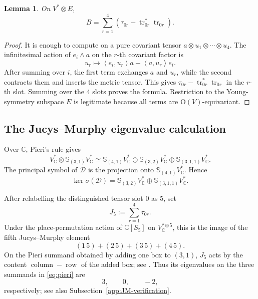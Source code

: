 \documentclass[reqno,11pt]{amsart}
\newtheorem{lemma}[theorem]{Lemma}
\theoremstyle{definition}
\newcommand{\bbC}{\mathbb C}
\newcommand{\cD}{\mathcal D}
\newcommand{\Hook}{\mathbb S_{(3,1)}}
\newcommand{\inner}[2]{\left\langle #1,#2\right\rangle}
\begin{document}
\begin{lemma}\label{lem:Bformula}
On $V^*\otimes E$,
\begin{equation}\label{eq:Bformula}
  B=\sum_{r=1}^4
  \left(
    \tau_{0r}-\operatorname{tr}_{0r}^*\operatorname{tr}_{0r}
  \right).
\end{equation}
\end{lemma}

\begin{proof}
It is enough to compute on a pure covariant tensor
$a\otimes u_1\otimes\cdots\otimes u_4$. The infinitesimal action of
$e_i\wedge a$ on the $r$-th covariant factor is
$$
  u_r\longmapsto
  \inner{e_i}{u_r}a-\inner{a}{u_r}e_i.
$$
After summing over $i$, the first term exchanges $a$ and $u_r$, while the
second contracts them and inserts the metric tensor. This gives
$\tau_{0r}-\operatorname{tr}_{0r}^*\operatorname{tr}_{0r}$ in the $r$-th
slot. Summing over the $4$ slots proves the formula. Restriction to the
Young-symmetry subspace $E$ is legitimate because all terms are
$\mathrm O(V)$-equivariant.
\end{proof}

\subsection{The Jucys--Murphy eigenvalue calculation}

Over $\bbC$, Pieri's rule gives
\begin{equation}\label{eq:pieri}
  V_\bbC^*\otimes\Hook V_\bbC^*
  \simeq
  \mathbb S_{(4,1)}V_\bbC^*
  \oplus
  \mathbb S_{(3,2)}V_\bbC^*
  \oplus
  \mathbb S_{(3,1,1)}V_\bbC^*.
\end{equation}
The principal symbol of $\cD$ is the projection onto
$\mathbb S_{(4,1)}V_\bbC^*$. Hence
\begin{equation}\label{eq:kernel-symbol}
  \ker\sigma(\cD)
  =
  \mathbb S_{(3,2)}V_\bbC^*
  \oplus
  \mathbb S_{(3,1,1)}V_\bbC^*.
\end{equation}

After relabelling the distinguished tensor slot $0$ as $5$, set
$$
  J_5:=\sum_{r=1}^4\tau_{0r}.
$$
Under the place-permutation action of $\bbC[S_5]$ on
$V_\bbC^{*\otimes5}$, this is the image of the fifth Jucys--Murphy element
$$
  (1\,5)+(2\,5)+(3\,5)+(4\,5).
$$
On the Pieri summand obtained by adding one box to $(3,1)$,
$J_5$ acts by the content
$\operatorname{column}-\operatorname{row}$ of the added box;
see \cite[\S\S3.2--3.3]{CeccheriniScarabottiTolli10}.
Thus its eigenvalues on the three summands in \eqref{eq:pieri} are
\begin{equation}\label{eq:contents}
  3,\qquad 0,\qquad -2,
\end{equation}
respectively; see also Subsection~\ref{app:JM-verification}.
\end{document}

